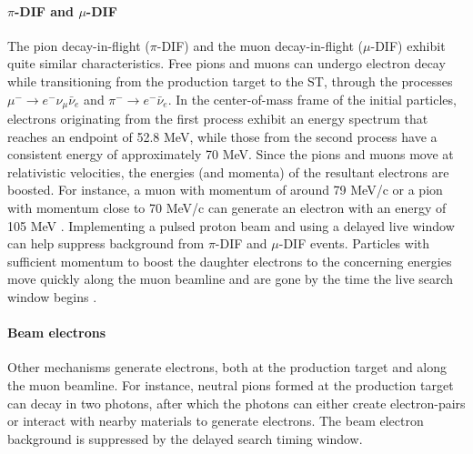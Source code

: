 \paragraph{$\pi$-DIF and $\mu$-DIF}
The pion decay-in-flight ($\pi$-DIF) and the muon decay-in-flight ($\mu$-DIF) 
exhibit quite similar characteristics. Free pions and muons can 
undergo electron decay while transitioning from the 
production target to the ST, through the processes 
$\mu^- \rightarrow e^- \nu_\mu \bar{\nu}_e$ and 
$\pi^- \rightarrow e^- \bar{\nu}_e$. In the center-of-mass 
frame of the initial particles, electrons originating 
from the first process exhibit an energy spectrum that 
reaches an endpoint of 52.8 MeV, while those from the 
second process have a consistent energy of approximately 
70 MeV. Since the pions and muons move at relativistic velocities, 
the energies (and momenta) of the resultant electrons are 
boosted. For instance, a muon with momentum of around 
79 MeV/c or a pion with momentum close to 70 MeV/c can generate 
an electron with an energy of 105 MeV \cite{bartoszek2015mu2e}. 
Implementing a pulsed proton beam and using a delayed 
live window can help suppress background from $\pi$-DIF and 
$\mu$-DIF events. Particles with sufficient momentum 
to boost the daughter electrons to the concerning energies 
move quickly along the muon beamline and are gone by the 
time the live search window begins \cite{bobbb}. 


\paragraph{Beam electrons}\label{beamelectrons}
Other mechanisms generate electrons, both at the production target 
and along the muon beamline. For instance, neutral pions formed at 
the production target can decay in two photons, after which the 
photons can either create electron-pairs or interact with nearby 
materials to generate electrons. 
The beam electron background is suppressed by the delayed search timing window.


